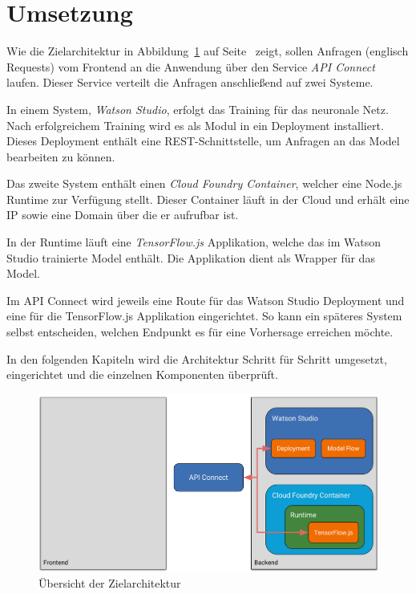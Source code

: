 \section{Umsetzung}
Wie die Zielarchitektur in Abbildung~\ref{fig:umsetzung_zielarchitektur} auf
Seite~\pageref{fig:umsetzung_zielarchitektur} zeigt, sollen Anfragen (englisch Requests) vom Frontend an die Anwendung
über den Service \textit{API Connect} laufen. Dieser Service verteilt die Anfragen anschließend auf zwei Systeme.

In einem System, \textit{Watson Studio}, erfolgt das Training für das neuronale Netz. Nach erfolgreichem Training wird es
als Modul in ein Deployment installiert. Dieses Deployment enthält eine REST-Schnittstelle, um Anfragen an das Model
bearbeiten zu können.

Das zweite System enthält einen \textit{Cloud Foundry Container}, welcher eine Node.js Runtime zur Verfügung stellt. Dieser
Container läuft in der Cloud und erhält eine IP sowie eine Domain über die er aufrufbar ist.

In der Runtime läuft eine \textit{TensorFlow.js} Applikation, welche das im Watson Studio trainierte Model enthält. Die
Applikation dient als Wrapper für das Model.

Im API Connect wird jeweils eine Route für das Watson Studio Deployment und eine für die TensorFlow.js Applikation
eingerichtet. So kann ein späteres System selbst entscheiden, welchen Endpunkt es für eine Vorhersage erreichen möchte.

In den folgenden Kapiteln wird die Architektur Schritt für Schritt umgesetzt, eingerichtet und die einzelnen Komponenten
überprüft.

\begin{figure}[h]
    \centering
    \includegraphics[width=\textwidth]{images/kapitel_3/architektur_uebersicht.pdf}
    \caption{Übersicht der Zielarchitektur}
    \label{fig:umsetzung_zielarchitektur}
\end{figure}

